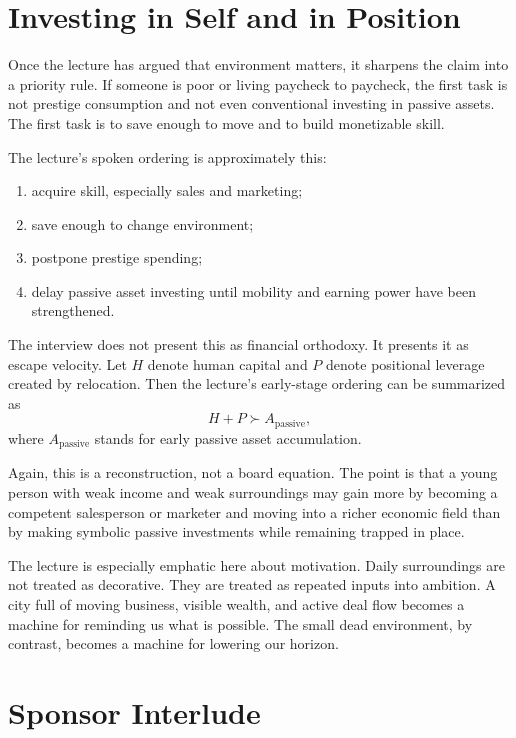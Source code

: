 \section{Investing in Self and in Position}

Once the lecture has argued that environment matters, it sharpens the claim into a priority rule. If someone is poor or living paycheck to paycheck, the first task is not prestige consumption and not even conventional investing in passive assets. The first task is to save enough to move and to build monetizable skill.

The lecture's spoken ordering is approximately this:
\begin{enumerate}
\item acquire skill, especially sales and marketing;
\item save enough to change environment;
\item postpone prestige spending;
\item delay passive asset investing until mobility and earning power have been strengthened.
\end{enumerate}

The interview does not present this as financial orthodoxy. It presents it as escape velocity. Let \(H\) denote human capital and \(P\) denote positional leverage created by relocation. Then the lecture's early-stage ordering can be summarized as
\begin{equation}
H + P \succ A_{\text{passive}},
\end{equation}
where \(A_{\text{passive}}\) stands for early passive asset accumulation.

Again, this is a reconstruction, not a board equation. The point is that a young person with weak income and weak surroundings may gain more by becoming a competent salesperson or marketer and moving into a richer economic field than by making symbolic passive investments while remaining trapped in place.

The lecture is especially emphatic here about motivation. Daily surroundings are not treated as decorative. They are treated as repeated inputs into ambition. A city full of moving business, visible wealth, and active deal flow becomes a machine for reminding us what is possible. The small dead environment, by contrast, becomes a machine for lowering our horizon.

\section{Sponsor Interlude}

